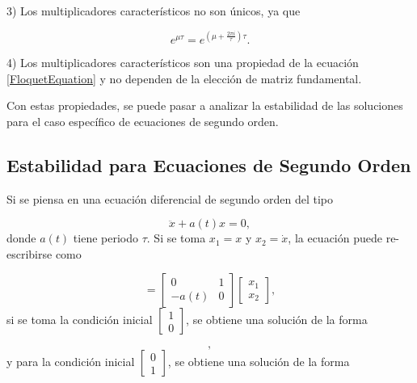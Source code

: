 \documentclass[10pt,a4paper]{report}
\begin{document}
3) Los multiplicadores característicos no son únicos, ya que

\begin{equation}
e^{\mu \tau} = e^{(\mu  +\frac{2\pi i}{\tau} )\tau}.
\end{equation}

4) Los multiplicadores característicos son una propiedad de la ecuación \eqref{FloquetEquation} y no dependen de la elección de matriz fundamental.

Con estas propiedades, se puede pasar a analizar la estabilidad de las soluciones para el caso específico de ecuaciones de segundo orden.

\subsection{Estabilidad para Ecuaciones de Segundo Orden}\label{EstabilidadSO}

Si se piensa en una ecuación diferencial de segundo orden del tipo

\begin{equation}
\ddot{x} + a(t)x= 0,
\end{equation} donde $a(t)$ tiene periodo $\tau$. Si se toma $x_1 = x$ y $x_2 = \dot{x}$, la ecuación puede re-escribirse como

\begin{equation}
[\begin{array}{c}
\dot{x_1} \\
\dot{x_2}
\end{array}] = [\begin{array}{cc}
0 & 1 \\
-a(t) & 0
\end{array}][\begin{array}{c} 
x_1 \\ 
x_2

\end{array}],
\end{equation} si se toma la condición inicial $[\begin{array}{c} 1 \\ 0 \end{array}]$, se obtiene una solución de la forma

\begin{equation}
[\begin{array}{c}
x_1^1(t) \\
\dot{x_1^1(t)}
\end{array}],
\end{equation} y para la condición inicial $[\begin{array}{c} 0 \\ 1 \end{array}]$, se obtiene una solución de la forma
\end{document}
